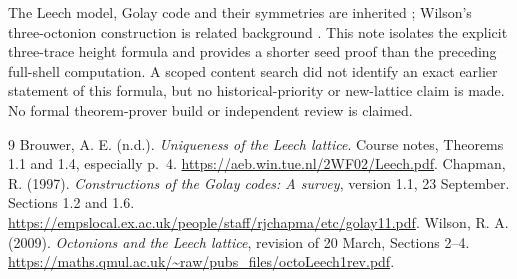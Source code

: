 \documentclass[10pt,reqno]{amsart}
\theoremstyle{remark}\newtheorem{remark}[theorem]{Remark}
\begin{document}
The Leech model, Golay code and their symmetries are inherited \cite{brouwer,chapman}; Wilson's three-octonion construction is related background \cite{wilson}. This note isolates the explicit three-trace height formula and provides a shorter seed proof than the preceding full-shell computation. A scoped content search did not identify an exact earlier statement of this formula, but no historical-priority or new-lattice claim is made. No formal theorem-prover build or independent review is claimed.
\begin{thebibliography}{9}
 Brouwer, A. E. (n.d.). \emph{Uniqueness of the Leech lattice}. Course notes, Theorems 1.1 and 1.4, especially p.~4. \url{https://aeb.win.tue.nl/2WF02/Leech.pdf}.
 Chapman, R. (1997). \emph{Constructions of the Golay codes: A survey}, version 1.1, 23 September. Sections 1.2 and 1.6. \url{https://empslocal.ex.ac.uk/people/staff/rjchapma/etc/golay11.pdf}.
 Wilson, R. A. (2009). \emph{Octonions and the Leech lattice}, revision of 20 March, Sections 2--4. \url{https://maths.qmul.ac.uk/~raw/pubs_files/octoLeech1rev.pdf}.
\end{thebibliography}
\end{document}
